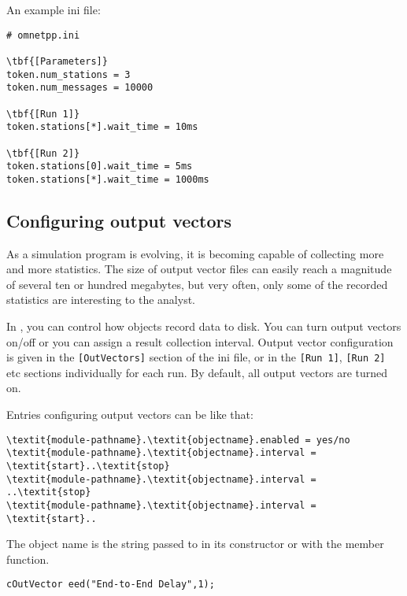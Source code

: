 An example ini file:

\begin{Verbatim}[commandchars=\\\{\}]
# omnetpp.ini

\tbf{[Parameters]}
token.num_stations = 3
token.num_messages = 10000

\tbf{[Run 1]}
token.stations[*].wait_time = 10ms

\tbf{[Run 2]}
token.stations[0].wait_time = 5ms
token.stations[*].wait_time = 1000ms
\end{Verbatim}


\subsection{Configuring output vectors}
\label{sec:ch-run-sim:outvectors-section}

As a simulation program is evolving, it is becoming capable of
collecting more and more statistics. The size of output vector
files can easily reach a magnitude of
several ten or hundred megabytes, but very often, only some of the
recorded statistics are interesting to the analyst.


In {\opp}, you can control how  objects record data
to disk. You can turn output vectors on/off or you can assign a result
collection interval. Output vector configuration is given in the
\texttt{[OutVectors]} section of the ini file, or in the \texttt{[Run
  1]}, \texttt{[Run 2]} etc sections individually for each run. By
default, all output vectors are turned on.


Entries configuring output vectors can be like that:

\begin{Verbatim}[commandchars=\\\{\}]
\textit{module-pathname}.\textit{objectname}.enabled = yes/no
\textit{module-pathname}.\textit{objectname}.interval = \textit{start}..\textit{stop}
\textit{module-pathname}.\textit{objectname}.interval = ..\textit{stop}
\textit{module-pathname}.\textit{objectname}.interval = \textit{start}..
\end{Verbatim}

The object name is the string passed to  in its constructor
or with the  member function.

\begin{verbatim}
cOutVector eed("End-to-End Delay",1);
\end{verbatim}

